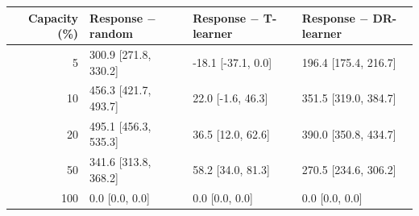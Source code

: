 \begin{tabular}{@{}rlll@{}}
\toprule
Capacity (\%) & Response $-$ random & Response $-$ T-learner & Response $-$ DR-learner \\
\midrule
5 & 300.9 [271.8, 330.2] & -18.1 [-37.1, 0.0] & 196.4 [175.4, 216.7] \\
10 & 456.3 [421.7, 493.7] & 22.0 [-1.6, 46.3] & 351.5 [319.0, 384.7] \\
20 & 495.1 [456.3, 535.3] & 36.5 [12.0, 62.6] & 390.0 [350.8, 434.7] \\
50 & 341.6 [313.8, 368.2] & 58.2 [34.0, 81.3] & 270.5 [234.6, 306.2] \\
100 & 0.0 [0.0, 0.0] & 0.0 [0.0, 0.0] & 0.0 [0.0, 0.0] \\
\bottomrule
\end{tabular}
